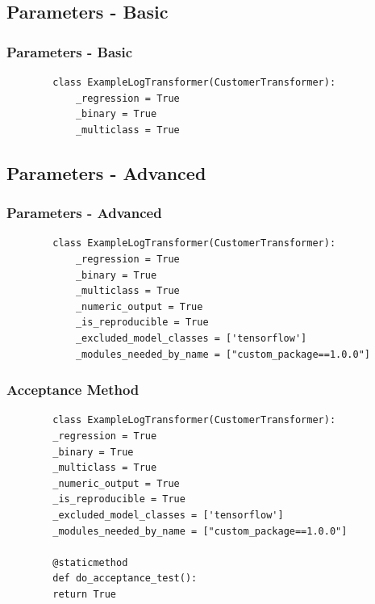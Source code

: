 \documentclass[11pt,
               aspectratio=169,
               hyperref={colorlinks}
               ]{beamer}
\begin{document}
		\subsection{Parameters - Basic}
	\begin{frame}[fragile]
		\frametitle{Parameters - Basic}
		\begin{verbatim}
		class ExampleLogTransformer(CustomerTransformer):
			_regression = True
			_binary = True
			_multiclass = True
		\end{verbatim}
			
\end{frame}
		\subsection{Parameters - Advanced}
	\begin{frame}[fragile]
		\frametitle{Parameters - Advanced}
		\begin{verbatim}
		class ExampleLogTransformer(CustomerTransformer):
			_regression = True
			_binary = True
			_multiclass = True
			_numeric_output = True
			_is_reproducible = True
			_excluded_model_classes = ['tensorflow']
			_modules_needed_by_name = ["custom_package==1.0.0"]
		\end{verbatim}
			
\end{frame}
	\begin{frame}[fragile]
		\frametitle{Acceptance Method}
		\begin{verbatim}
		class ExampleLogTransformer(CustomerTransformer):
		_regression = True
		_binary = True
		_multiclass = True
		_numeric_output = True
		_is_reproducible = True
		_excluded_model_classes = ['tensorflow']
		_modules_needed_by_name = ["custom_package==1.0.0"]
	
		@staticmethod
		def do_acceptance_test():
		return True
		\end{verbatim}
			
\end{frame}
\end{document}
